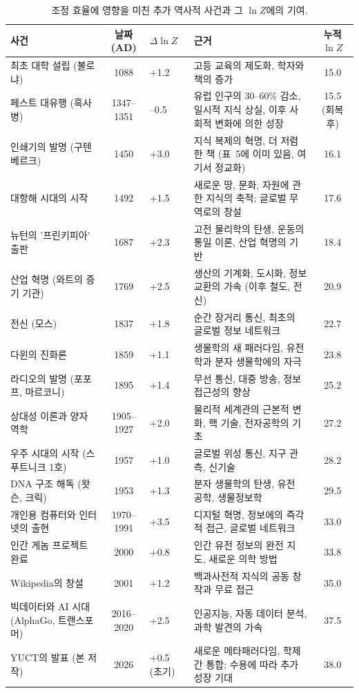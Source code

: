 \documentclass[12pt,a4paper]{article}
\theoremstyle{remark}
\begin{document}
	\begin{table}[htbp]
		\centering
		\caption{조정 효율에 영향을 미친 추가 역사적 사건과 그 \(\ln Z\)에의 기여.}
		\label{tab:expanded-events}
		\scriptsize  
		\begin{tabular}{p{3.2cm} c p{2.5cm} p{4.5cm} c}
			\toprule
			\textbf{사건} & \textbf{날짜 (AD)} & \textbf{\(\Delta \ln Z\)} & \textbf{근거} & \textbf{누적 \(\ln Z\)} \\
			\midrule
			최초 대학 설립 (볼로냐) & 1088 & +1.2 & 고등 교육의 제도화, 학자와 책의 증가 & 15.0 \\
			페스트 대유행 (흑사병) & 1347–1351 & –0.5 & 유럽 인구의 30–60\% 감소, 일시적 지식 상실, 이후 사회적 변화에 의한 성장 & 15.5 (회복 후) \\
			인쇄기의 발명 (구텐베르크) & 1450 & +3.0 & 지식 복제의 혁명, 더 저렴한 책 (표~5에 이미 있음, 여기서 정교화) & 16.1 \\
			대항해 시대의 시작 & 1492 & +1.5 & 새로운 땅, 문화, 자원에 관한 지식의 축적; 글로벌 무역로의 창설 & 17.6 \\
			뉴턴의 '프린키피아' 출판 & 1687 & +2.3 & 고전 물리학의 탄생, 운동의 통일 이론, 산업 혁명의 기반 & 18.4 \\
			산업 혁명 (와트의 증기 기관) & 1769 & +2.5 & 생산의 기계화, 도시화, 정보 교환의 가속 (이후 철도, 전신) & 20.9 \\
			전신 (모스) & 1837 & +1.8 & 순간 장거리 통신, 최초의 글로벌 정보 네트워크 & 22.7 \\
			다윈의 진화론 & 1859 & +1.1 & 생물학의 새 패러다임, 유전학과 분자 생물학에의 자극 & 23.8 \\
			라디오의 발명 (포포프, 마르코니) & 1895 & +1.4 & 무선 통신, 대중 방송, 정보 접근성의 향상 & 25.2 \\
			상대성 이론과 양자 역학 & 1905–1927 & +2.0 & 물리적 세계관의 근본적 변화, 핵 기술, 전자공학의 기초 & 27.2 \\
			우주 시대의 시작 (스푸트니크 1호) & 1957 & +1.0 & 글로벌 위성 통신, 지구 관측, 신기술 & 28.2 \\
			DNA 구조 해독 (왓슨, 크릭) & 1953 & +1.3 & 분자 생물학의 탄생, 유전 공학, 생물정보학 & 29.5 \\
			개인용 컴퓨터와 인터넷의 출현 & 1970–1991 & +3.5 & 디지털 혁명, 정보에의 즉각적 접근, 글로벌 네트워크 & 33.0 \\
			인간 게놈 프로젝트 완료 & 2000 & +0.8 & 인간 유전 정보의 완전 지도, 새로운 의학 방법 & 33.8 \\
			Wikipedia의 창설 & 2001 & +1.2 & 백과사전적 지식의 공동 창작과 무료 접근 & 35.0 \\
			빅데이터와 AI 시대 (AlphaGo, 트랜스포머) & 2016–2020 & +2.5 & 인공지능, 자동 데이터 분석, 과학 발견의 가속 & 37.5 \\
			YUCT의 발표 (본 저작) & 2026 & +0.5 (초기) & 새로운 메타패러다임, 학제간 통합; 수용에 따라 추가 성장 기대 & 38.0 \\
			\bottomrule
		\end{tabular}
	\end{table}
	
\end{document}
